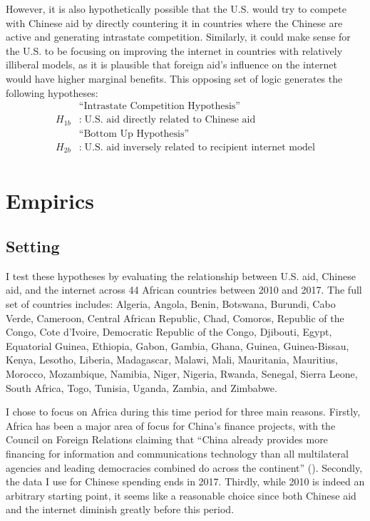 \documentclass[12pt]{article}
\begin{document}
However, it is also hypothetically possible that the U.S. would try to compete with Chinese aid by directly countering it in countries where the Chinese are active and generating intrastate competition. Similarly, it could make sense for the U.S. to be focusing on improving the internet in countries with relatively illiberal models, as it is plausible that foreign aid's influence on the internet would have higher marginal benefits. This opposing set of logic generates the following hypotheses:
\begin{align*}
    &\text{``Intrastate Competition Hypothesis''}\\
    H_{1b}&:\;\text{U.S. aid directly related to Chinese aid}\\
    &\text{``Bottom Up Hypothesis''}\\
    H_{2b}&:\;\text{U.S. aid inversely related to recipient internet model}\\
\end{align*}

\section*{Empirics}
\subsection*{Setting}
I test these hypotheses by evaluating the relationship between U.S. aid, Chinese aid, and the internet across 44 African countries between 2010 and 2017. The full set of countries includes: Algeria, Angola, Benin, Botswana, Burundi, Cabo Verde, Cameroon, Central African Republic, Chad, Comoros, Republic of the Congo, Cote d'Ivoire, Democratic Republic of the Congo, Djibouti, Egypt, Equatorial Guinea, Ethiopia, Gabon, Gambia, Ghana, Guinea, Guinea-Bissau, Kenya, Lesotho, Liberia, Madagascar, Malawi, Mali, Mauritania, Mauritius, Morocco, Mozambique, Namibia, Niger, Nigeria, Rwanda, Senegal, Sierra Leone, South Africa, Togo, Tunisia, Uganda, Zambia, and Zimbabwe. 

I chose to focus on Africa during this time period for three main reasons. Firstly, Africa has been a major area of focus for China's finance projects, with the Council on Foreign Relations claiming that ``China already provides more financing for information and communications technology than all multilateral agencies and leading democracies combined do across the continent'' (\cite{kurlantzicketal.2020}). Secondly, the data I use for Chinese spending ends in 2017. Thirdly, while 2010 is indeed an arbitrary starting point, it seems like a reasonable choice since both Chinese aid and the internet diminish greatly before this period.
\end{document}
